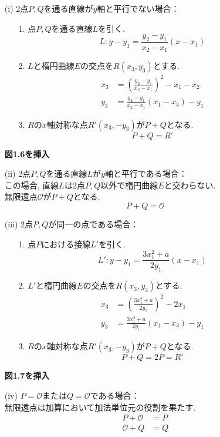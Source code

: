 \begin{enumerate}
  \item[(i)　] 2点$P,Q$を通る直線が$y$軸と平行でない場合：
  \begin{enumerate}
    \item[1.　] 点$P,Q$を通る直線$L$を引く.
    \[
      L : y-y_1 = \frac{y_2-y_1}{x_2-x_1}(x-x_1)
    \]
    \item[2.　] $L$と楕円曲線$E$の交点を$R(x_3,y_3)$とする.
    \[
    \begin{aligned}
      x_3 &= \left(\frac{y_2-y_1}{x_2-x_1}\right)^2-x_1-x_2\\
      y_3 &= \frac{y_2-y_1}{x_2-x_1}(x_1-x_3)-y_1
    \end{aligned}
    \]
    \item[3.　] $R$の$x$軸対称な点$R'(x_3,-y_3)$が$P+Q$となる.
    \[
      P+Q=R'
    \]
  \end{enumerate}
  {\LARGE\textbf{図1.6を挿入}}\\
  \item[(ii)　] 2点$P,Q$を通る直線$L$が$y$軸と平行である場合：\\
  \indent この場合, 直線$L$は2点$P,Q$以外で楕円曲線$E$と交わらない.\\ 
  \indent 無限遠点$\mathcal{O}$が$P+Q$となる.
  \[
    P+Q=\mathcal{O}
  \]
  \item[(iii)　] 2点$P,Q$が同一の点である場合：\\
  \begin{enumerate}
    \item[1.　] 点$P$における接線$L'$を引く. 
    \[
      L' : y-y_1 = \frac{3x_1^2 + a}{2y_1}(x - x_1)
    \] 
    \item[2.　] $L'$と楕円曲線$E$の交点を$R(x_3,y_3)$とする.
    \[
    \begin{aligned}
      x_3 &= \left(\frac{3x_1^2 + a}{2y_1}\right)^2-2x_1\\
      y_3 &= \frac{3x_1^2 + a}{2y_1}(x_1-x_3)-y_1
    \end{aligned}
    \]
    \item[3.　] $R$の$x$軸対称な点$R'(x_3,-y_3)$が$P+Q$となる.
    \[
      P+Q=2P=R'
    \]
  \end{enumerate}
  {\Huge\textbf{図1.7を挿入}}
  \item[(iv)　] $P=\mathcal{O}$または$Q=\mathcal{O}$である場合：\\
  \indent 無限遠点は加算において加法単位元の役割を果たす.
  \[
  \begin{aligned}
    P+\mathcal{O}&=P\\
    \mathcal{O}+Q&=Q
  \end{aligned}
  \]    
\end{enumerate}
